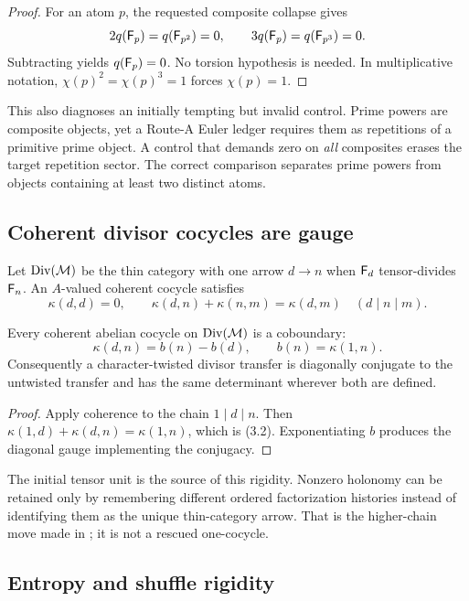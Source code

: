 \begin{proof}
For an atom $p$, the requested composite collapse gives
\[
  2q(\mathsf F_p)=q(\mathsf F_{p^2})=0,
  \qquad
  3q(\mathsf F_p)=q(\mathsf F_{p^3})=0.
\]
Subtracting yields $q(\mathsf F_p)=0$.  No torsion hypothesis is needed.  In
multiplicative notation, $\chi(p)^2=\chi(p)^3=1$ forces $\chi(p)=1$.
\end{proof}

This also diagnoses an initially tempting but invalid control.  Prime powers
are composite objects, yet a Route-A Euler ledger requires them as
repetitions of a primitive prime object.  A control that demands zero on
\emph{all} composites erases the target repetition sector.  The correct
comparison separates prime powers from objects containing at least two
distinct atoms.

\subsection{Coherent divisor cocycles are gauge}

Let $\operatorname{Div}(\mathcal M)$ be the thin category with one arrow $d\to n$
when $\mathsf F_d$ tensor-divides $\mathsf F_n$.  An $A$-valued coherent cocycle satisfies
\[
  \kappa(d,d)=0,
  \qquad
  \kappa(d,n)+\kappa(n,m)=\kappa(d,m)
  \quad(d\mid n\mid m).
\]

\begin{theorem}
\label{thm:coboundary}
Every coherent abelian cocycle on $\operatorname{Div}(\mathcal M)$ is a coboundary:
\[
  \kappa(d,n)=b(n)-b(d),
  \qquad b(n)=\kappa(1,n).
  \tag{3.2}
\]
Consequently a character-twisted divisor transfer is diagonally conjugate to
the untwisted transfer and has the same determinant wherever both are
defined.
\end{theorem}

\begin{proof}
Apply coherence to the chain $1\mid d\mid n$.  Then
$\kappa(1,d)+\kappa(d,n)=\kappa(1,n)$, which is (3.2).  Exponentiating $b$
produces the diagonal gauge implementing the conjugacy.
\end{proof}

The initial tensor unit is the source of this rigidity.  Nonzero holonomy can
be retained only by remembering different ordered factorization histories
instead of identifying them as the unique thin-category arrow.  That is the
higher-chain move made in ; it is not a rescued one-cocycle.

\subsection{Entropy and shuffle rigidity}

